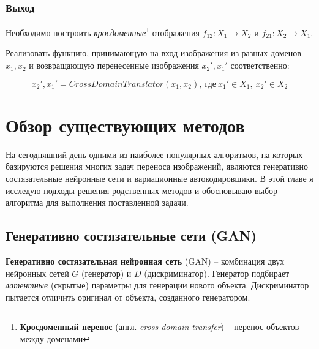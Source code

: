 \documentclass[11pt,a4paper]{extarticle}
\begin{document}
		\subsubsection*{Выход}
			Необходимо построить \textit{кросдоменные}\footnote{
				\textbf{Кросдоменный перенос} (англ. \textit{cross-domain transfer}) -- перенос объектов между доменами 
			} отображения \(f_{12}\!: X_{1} \longrightarrow X_{2}\) и \(f_{21}\!: X_{2} \longrightarrow X_{1}\).
			
			\noindent
			Реализовать функцию, принимающую на вход изображения из разных доменов
			\(x_{1}, x_{2}\) и возвращающую перенесенные изображения \(x_{2}', x_{1}'\) соответственно: 

			\begin{equation}
				x_{2}', x_{1}' = CrossDomainTranslator(x_{1}, x_{2}),\ \text{где}\ x_{1}' \in X_{1},\ x_{2}' \in X_{2}
			\end{equation}
	

\newpage
\section{Обзор существующих методов}
	
	На сегодняшний день одними из наиболее популярных алгоритмов, на которых базируются решения многих задач переноса изображений, являются
	генеративно состязательные нейронные сети и вариационные автокодировщики.
	В этой главе я исследую подходы решения родственных методов и обосновываю выбор алгоритма для выполнения поставленной задачи. 

	\subsection{Генеративно состязательные сети (GAN)}		

		\textbf{Генеративно состязательная нейронная сеть} (GAN) -- комбинация двух нейронных сетей $G$ (генератор) и $D$ (дискриминатор).
		Генератор подбирает \textit{латентные} (скрытые) параметры для генерации нового объекта.
		Дискриминатор пытается отличить оригинал от объекта, созданного генератором.
		
\end{document}
